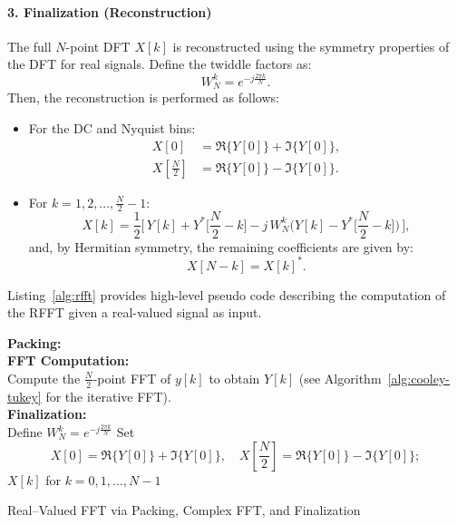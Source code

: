 \documentclass[12pt,letter]{article}
\begin{document}
\paragraph{3. Finalization (Reconstruction)}
The full $N$-point DFT $X[k]$ is reconstructed using the symmetry properties
of the DFT for real signals. Define the twiddle factors as:
\[
W_N^k = e^{-j\frac{2\pi k}{N}}.
\]
Then, the reconstruction is performed as follows:
\begin{itemize}
  \item For the DC and Nyquist bins:
  \begin{align}
    X[0] &= \Re\{Y[0]\} + \Im\{Y[0]\}, \label{eq:dc}\\[1mm]
    X\left[\frac{N}{2}\right] &= \Re\{Y[0]\} - \Im\{Y[0]\}. \label{eq:nyquist}
  \end{align}
  \item For $k = 1, 2, \dots, \frac{N}{2}-1$:
  \begin{equation}
    X[k] = \frac{1}{2}\Big[\, Y[k] + Y^*\Big[\frac{N}{2}-k\Big] - j\,W_N^k\Big( Y[k] - Y^*\Big[\frac{N}{2}-k\Big] \Big)\,\Big],
    \label{eq:finalization}
  \end{equation}
  and, by Hermitian symmetry, the remaining coefficients are given by:
  \[
  X[N-k] = X[k]^*.
  \]
\end{itemize}

Listing~\ref{alg:rfft} provides high-level pseudo code describing the
computation of the RFFT given a real-valued signal as input.

\begin{algorithm}[H]
\SetAlgoLined
{}
\textbf{Packing:}\\
\textbf{FFT Computation:}\\
Compute the $\frac{N}{2}$-point FFT of $y[k]$ to obtain $Y[k]$ \;
(see Algorithm~\ref{alg:cooley-tukey} for the iterative FFT).\\
\textbf{Finalization:}\\
Define $W_N^k = e^{-j\frac{2\pi k}{N}}$ \;
Set
\[
X[0] = \Re\{Y[0]\} + \Im\{Y[0]\}, \quad X\left[\frac{N}{2}\right] = \Re\{Y[0]\} - \Im\{Y[0]\};
\]
\Return $X[k]$ for $k = 0,1,\dots,N-1$\;
\caption{Real--Valued FFT via Packing, Complex FFT, and Finalization}
\label{alg:rfft}
\end{algorithm}
\end{document}
